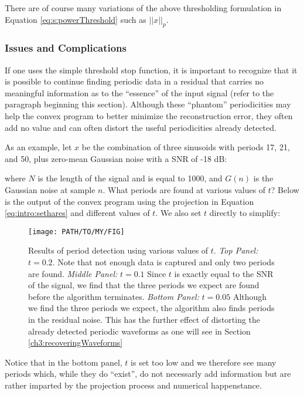    There are of course many variations of the above thresholding formulation in Equation \eqref{eq:s:powerThreshold} such as $||x||_p$.

        \subsubsection{Issues and Complications}
        If one uses the simple threshold stop function, it is important to recognize that it is possible to continue finding periodic data in a residual that carries no meaningful information as to the ``essence'' of the input signal (refer to the paragraph beginning this section). Although these ``phantom'' periodicities may help the convex program to better minimize the reconstruction error, they often add no value and can often distort the useful periodicities already detected.

        As an example, let $x$ be the combination of three sinusoids with periods 17, 21, and 50, plus zero-mean Gaussian noise with a SNR of -18 dB:

        where $N$ is the length of the signal and is equal to 1000, and $G(n)$ is the Gaussian noise at sample $n$. What periods are found at various values of $t$? Below is the output of the convex program using the projection in Equation \eqref{eq:intro:sethares} and different values of $t$. We also set $t$ directly to simplify:
        \begin{figure}[h]
            \centering
            \texttt{[image: PATH/TO/MY/FIG]}
            \caption[A figure showing the effect of different threshold values for the stop function.]{Results of period detection using various values of $t$. \emph{Top Panel:} $t = 0.2$. Note that not enough data is captured and only two periods are found. \emph{Middle Panel:} $t = 0.1$ Since $t$ is exactly equal to the SNR of the signal, we find that the three periods we expect are found before the algorithm terminates. \emph{Bottom Panel:} $t = 0.05$ Although we find the three periods we expect, the algorithm also finds periods in the residual noise. This has the further effect of distorting the already detected periodic waveforms as one will see in Section \ref{ch3:recoveringWaveforms}}
            \label{fig:sandiego}
        \end{figure}
        Notice that in the bottom panel, $t$ is set too low and we therefore see many periods which, while they do ``exist'', do not necessarly add information but are rather imparted by the projection process and numerical happenstance.

